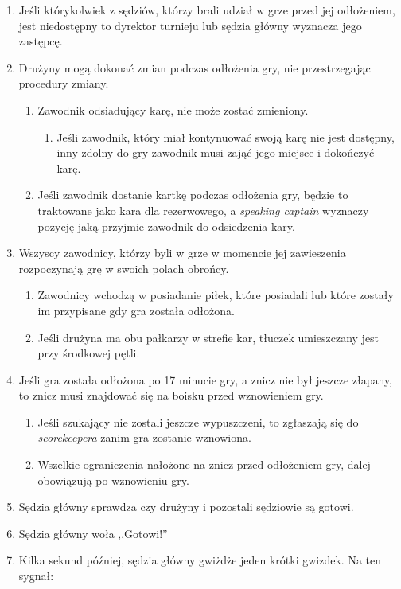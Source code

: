 \documentclass[11pt,a4paper]{article}
\begin{document}
\begin{enumerate}

\item
  Jeśli którykolwiek z sędziów, którzy brali udział w grze przed jej
  odłożeniem, jest niedostępny to dyrektor turnieju lub sędzia główny
  wyznacza jego zastępcę.
\item
  Drużyny mogą dokonać zmian podczas odłożenia gry, nie przestrzegając
  procedury zmiany.

  \begin{enumerate}
  
  \item
    Zawodnik odsiadujący karę, nie może zostać zmieniony.

    \begin{enumerate}
    
    \item
      Jeśli zawodnik, który miał kontynuować swoją karę nie jest
      dostępny, inny zdolny do gry zawodnik musi zająć jego miejsce i
      dokończyć karę.
    \end{enumerate}
  \item
    Jeśli zawodnik dostanie kartkę podczas odłożenia gry, będzie to
    traktowane jako kara dla rezerwowego, a \emph{speaking captain}
    wyznaczy pozycję jaką przyjmie zawodnik do odsiedzenia kary.
  \end{enumerate}
\item
  Wszyscy zawodnicy, którzy byli w grze w momencie jej zawieszenia
  rozpoczynają grę w swoich polach obrońcy.

  \begin{enumerate}
  
  \item
    Zawodnicy wchodzą w posiadanie piłek, które posiadali lub które
    zostały im przypisane gdy gra została odłożona.
  \item
    Jeśli drużyna ma obu pałkarzy w strefie kar, tłuczek umieszczany
    jest przy środkowej pętli.
  \end{enumerate}
\item
  Jeśli gra została odłożona po 17 minucie gry, a znicz nie był jeszcze
  złapany, to znicz musi znajdować się na boisku przed wznowieniem gry.

  \begin{enumerate}
  
  \item
    Jeśli szukający nie zostali jeszcze wypuszczeni, to zgłaszają się do
    \emph{scorekeepera} zanim gra zostanie wznowiona.
  \item
    Wszelkie ograniczenia nałożone na znicz przed odłożeniem gry, dalej
    obowiązują po wznowieniu gry.
  \end{enumerate}
\item
  Sędzia główny sprawdza czy drużyny i pozostali sędziowie są gotowi.
\item
  Sędzia główny woła ,,Gotowi!''
\item
  Kilka sekund później, sędzia główny gwiżdże jeden krótki gwizdek. Na
  ten sygnał:


\end{enumerate}
\end{document}
